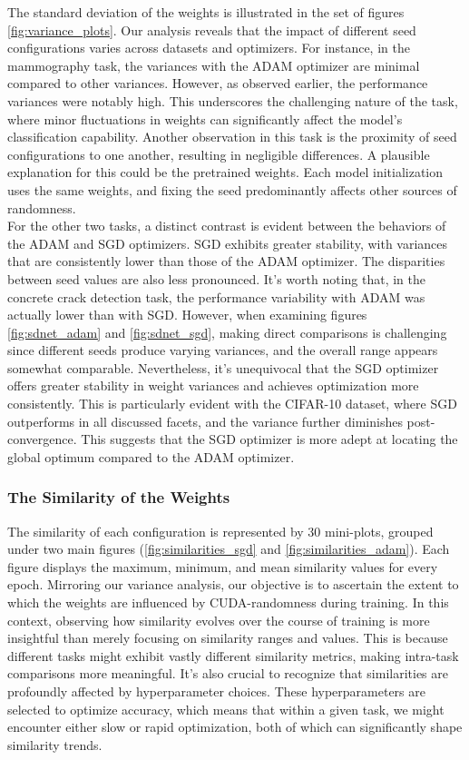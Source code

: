 The standard deviation of the weights is illustrated in the set of figures \ref{fig:variance_plots}. Our analysis reveals that the impact of different seed configurations varies across datasets and optimizers. For instance, in the mammography task, the variances with the ADAM optimizer are minimal compared to other variances. However, as observed earlier, the performance variances were notably high. This underscores the challenging nature of the task, where minor fluctuations in weights can significantly affect the model's classification capability. Another observation in this task is the proximity of seed configurations to one another, resulting in negligible differences. A plausible explanation for this could be the pretrained weights. Each model initialization uses the same weights, and fixing the seed predominantly affects other sources of randomness.\\

For the other two tasks, a distinct contrast is evident between the behaviors of the ADAM and SGD optimizers. SGD exhibits greater stability, with variances that are consistently lower than those of the ADAM optimizer. The disparities between seed values are also less pronounced. It's worth noting that, in the concrete crack detection task, the performance variability with ADAM was actually lower than with SGD. However, when examining figures \ref{fig:sdnet_adam} and \ref{fig:sdnet_sgd}, making direct comparisons is challenging since different seeds produce varying variances, and the overall range appears somewhat comparable. Nevertheless, it's unequivocal that the SGD optimizer offers greater stability in weight variances and achieves optimization more consistently. This is particularly evident with the CIFAR-10 dataset, where SGD outperforms in all discussed facets, and the variance further diminishes post-convergence. This suggests that the SGD optimizer is more adept at locating the global optimum compared to the ADAM optimizer.

\subsubsection*{The Similarity of the Weights}

The similarity of each configuration is represented by 30 mini-plots, grouped under two main figures (\ref{fig:similarities_sgd} and \ref{fig:similarities_adam}). Each figure displays the maximum, minimum, and mean similarity values for every epoch. Mirroring our variance analysis, our objective is to ascertain the extent to which the weights are influenced by CUDA-randomness during training. In this context, observing how similarity evolves over the course of training is more insightful than merely focusing on similarity ranges and values. This is because different tasks might exhibit vastly different similarity metrics, making intra-task comparisons more meaningful. It's also crucial to recognize that similarities are profoundly affected by hyperparameter choices. These hyperparameters are selected to optimize accuracy, which means that within a given task, we might encounter either slow or rapid optimization, both of which can significantly shape similarity trends.\\


